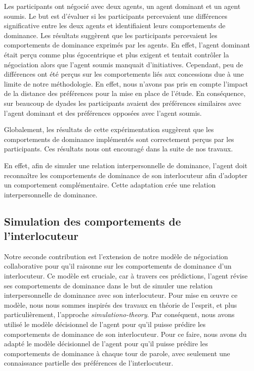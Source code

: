 	Les participants ont négocié avec deux agents, un agent dominant et un agent soumis. Le but est d'évaluer si les participants percevaient une différences significative entre les deux agents et identifiaient leurs comportements de dominance.
	Les résultats suggèrent que les participants percevaient les comportements de dominance exprimés par les agents. En effet, l'agent dominant était perçu comme plus égocentrique et plus exigent et tentait contrôler la négociation alors que l'agent soumis manquait d'initiatives. Cependant, peu de différences ont été perçus sur les comportements liés aux concessions due à une limite de notre méthodologie. En effet, nous n'avons pas pris en compte l'impact de la distance des préférences pour la mise en place de l'étude. En conséquence, sur beaucoup de dyades les participants avaient des préférences similaires avec l'agent dominant et des préférences opposées avec l'agent soumis. 
	
	Globalement, les résultats de cette expérimentation suggèrent que les comportements de dominance implémentés sont correctement perçus par les participants. Ces résultats nous ont encouragé dans la suite de nos travaux. 
	
	En effet, afin de simuler une relation interpersonnelle de dominance, l'agent doit reconnaître les comportements de dominance de son interlocuteur afin d'adopter un comportement complémentaire. Cette adaptation crée une relation interpersonnelle de dominance.  
	
	\subsection{Simulation des comportements de l'interlocuteur}
	
		Notre seconde contribution est l'extension de notre modèle de négociation collaborative pour qu'il raisonne sur les comportements de dominance d'un interlocuteur. Ce modèle est cruciale, car à travers ces prédictions, l'agent révise ses comportements de dominance dans le but de simuler une relation interpersonnelle de dominance avec son interlocuteur. 
		Pour mise en œuvre ce modèle, nous nous sommes inspirés des travaux en théorie de l'esprit, et plus particulièrement, l'approche \emph{simulationo-theory}. Par conséquent, nous avons utilisé le modèle décisionnel de l'agent pour qu'il puisse prédire les comportements de dominance de son interlocuteur. 
		Pour ce faire, nous avons du adapté le modèle décisionnel de l'agent pour qu'il puisse prédire les comportements de dominance à chaque tour de parole, avec seulement une connaissance partielle des préférences de l'interlocuteur. 
		
